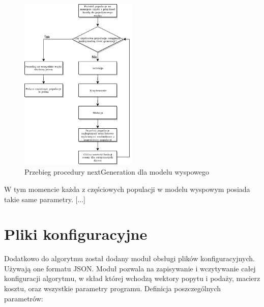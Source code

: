 \begin{figure}[H]
    \centering        
    \includegraphics[width=0.5\textwidth]{img/next_gen_wyspowy.png}
    \caption{Przebieg procedury nextGeneration dla modelu wyspowego}
    \label{next_gen_wyspowy_img}
\end{figure}

W tym momencie każda z częściowych populacji w modelu wyspowym posiada takie same parametry. [...]

\section{Pliki konfiguracyjne}
Dodatkowo do algorytmu został dodany moduł obsługi plików konfiguracyjnych. Używają one formatu JSON. Moduł pozwala na zapisywanie i wczytywanie 
całej konfiguracji algorytmu, w skład której wchodzą wektory popytu i podaży, macierz kosztu, oraz wszystkie parametry programu.
Definicja poszczególnych parametrów:

